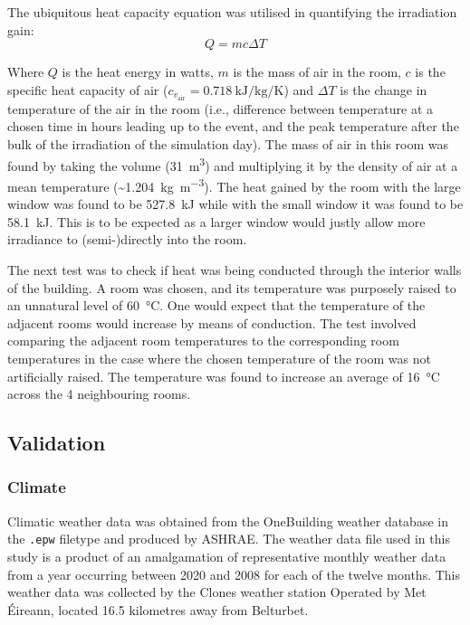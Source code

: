 The ubiquitous heat capacity equation was utilised in quantifying the irradiation gain: 
\begin{equation}
    Q = mc\Delta T 
\end{equation} 

Where $Q$ is the heat energy in watts, $m$ is the mass of air in the room, $c$ is the specific heat capacity of air ($c_{v_\text{air}} = \qty{0.718}{\kilo\joule\per\kilo\gram\per\kelvin}$) and $\Delta T$ is the change in temperature of the air in the room (i.e., difference between temperature at a chosen time in hours leading up to the event, and the peak temperature after the bulk of the irradiation of the simulation day). The mass of air in this room was found by taking the volume (\qty{31}{\meter\cubed}) and multiplying it by the density of air at a mean temperature (\sim \qty{1.204}{\kilo\gram\per\cubic\meter}). 
The heat gained by the room with the large window was found to be \qty{527.8}{\kilo\joule} while with the small window it was found to be \qty{58.1}{\kilo\joule}. This is to be expected as a larger window would justly allow more irradiance to (semi-)directly into the room. 

The next test was to check if heat was being conducted through the interior walls of the building. A room was chosen, and its temperature was purposely raised to an unnatural level of \qty{60}{\celsius}. One would expect that the temperature of the adjacent rooms would increase by means of conduction. The test involved comparing the adjacent room temperatures to the corresponding room temperatures in the case where the chosen temperature of the room was not artificially raised. The temperature was found to increase an average of \qty{16}{\celsius} across the 4 neighbouring rooms. 


\subsection{Validation} \label{subsubsec:validation}

\subsubsection{Climate}
Climatic weather data was obtained from the OneBuilding weather database \cite{onebuilding_climateonebuildingorg_nodate} in the \texttt{.epw} filetype and produced by ASHRAE. The weather data file used in this study is a product of an amalgamation of representative monthly weather data from a year occurring between 2020 and 2008 for each of the twelve months. This weather data was collected by the Clones weather station Operated by Met Éireann, located 16.5 kilometres away from Belturbet. 

